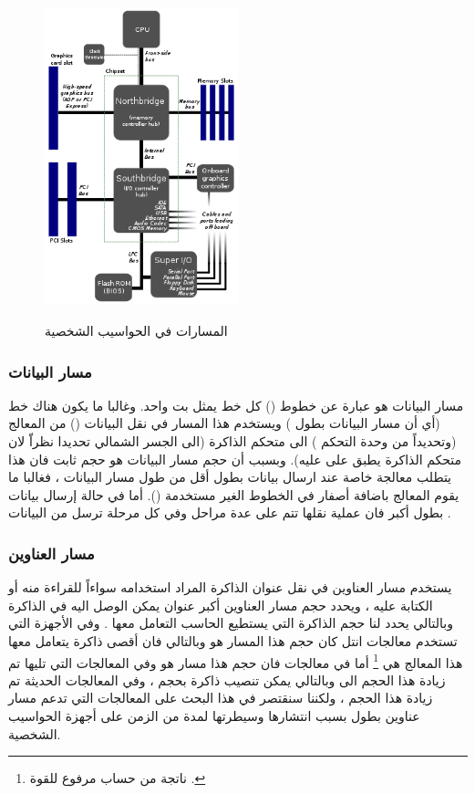 \documentclass[document.tex]{subfiles}
\begin{document}
\begin{figure}[h!]
  \caption{المسارات في الحواسيب الشخصية }
  \centering
   \includegraphics[width=0.5\textwidth]{../img/fsb}
  \label{fig:fsb} 
\end{figure}

\subsubsection{مسار البيانات }
مسار البيانات هو عبارة عن خطوط () كل خط يمثل بت واحد. وغالبا ما يكون هناك  خط (أي أن مسار البيانات بطول ) ويستخدم هذا المسار في نقل البيانات () من المعالج (وتحديداً من وحدة التحكم ) الى متحكم الذاكرة (الى الجسر الشمالي  تحديدا نظراّ لان متحكم الذاكرة يطبق على عليه). وبسبب أن حجم مسار البيانات هو حجم ثابت فان هذا يتطلب معالجة خاصة عند ارسال بيانات بطول أقل من طول مسار البيانات ، فغالبا ما يقوم المعالج باضافة أصفار في الخطوط الغير مستخدمة (). أما في حالة إرسال بيانات بطول أكبر فان عملية نقلها تتم على عدة مراحل وفي كل مرحلة ترسل  من البيانات .

\subsubsection{مسار العناوين }
يستخدم مسار العناوين في نقل عنوان الذاكرة المراد استخدامه سواءاً للقراءة منه أو الكتابة عليه ، ويحدد حجم مسار العناوين أكبر عنوان يمكن الوصل اليه في الذاكرة وبالتالي يحدد لنا حجم الذاكرة التي يستطيع الحاسب التعامل معها . وفي الأجهزة التي تستخدم معالجات انتل  كان حجم هذا المسار هو  وبالتالي فان أقصى ذاكرة يتعامل معها هذا المعالج هي \footnote{ناتجة من حساب  مرفوع للقوة .} أما في معالجات  فان حجم هذا مسار هو  وفي المعالجات التي تليها تم زيادة هذا الحجم الى  وبالتالي يمكن تنصيب ذاكرة بحجم  ، وفي المعالجات الحديثة تم زيادة هذا الحجم ، ولكننا سنقتصر في هذا البحث على المعالجات التي تدعم مسار عناوين بطول  بسبب انتشارها وسيطرتها لمدة من الزمن على أجهزة الحواسيب الشخصية.
\end{document}
